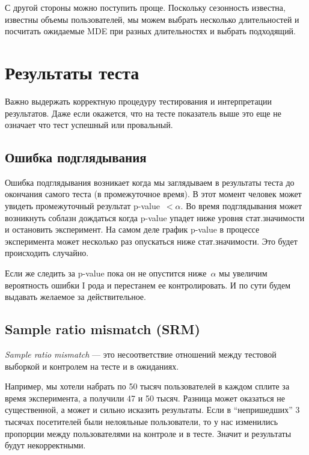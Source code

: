 \documentclass[../handbook.tex]{subfiles}
\begin{document}
С другой стороны можно поступить проще. Поскольку сезонность известна, известны  объемы пользователей, мы можем выбрать несколько длительностей и посчитать ожидаемые MDE при разных длительностях и выбрать подходящий.

\section{Результаты теста}

Важно выдержать корректную процедуру тестирования и интерпретации результатов.
Даже если окажется, что на тесте показатель выше это еще не означает что тест
успешный или провальный.

\subsection{Ошибка подглядывания}
Ошибка подглядывания возникает когда мы заглядываем в результаты теста до
окончания самого теста (в промежуточное время). В этот момент человек может
увидеть промежуточный результат p-value~$< \alpha$. Во время подглядывания
может возникнуть соблазн дождаться когда p-value упадет ниже уровня
стат.значимости и остановить эксперимент. На самом деле график p-value в
процессе эксперимента может несколько раз опускаться ниже стат.значимости. Это
будет происходить случайно.

Если же следить за p-value пока он не опустится ниже~$\alpha$ мы увеличим вероятность ошибки I рода и перестанем ее контролировать. И по сути будем выдавать желаемое за действительное.

\subsection{Sample ratio mismatch (SRM)}

\emph{Sample ratio mismatch} --- это несоответствие отношений между тестовой
выборкой и контролем на тесте и в ожиданиях.

Например, мы хотели набрать по 50 тысяч пользователей в каждом сплите за время
эксперимента, а получили 47 и 50 тысяч. Разница может оказаться не
существенной, а может и сильно исказить результаты. Если в ``непришедших'' 3
тысячах посетителей были нелояльные пользователи, то у нас изменились пропорции
между пользователями на контроле и в тесте. Значит и результаты будут
некорректными.
\end{document}
